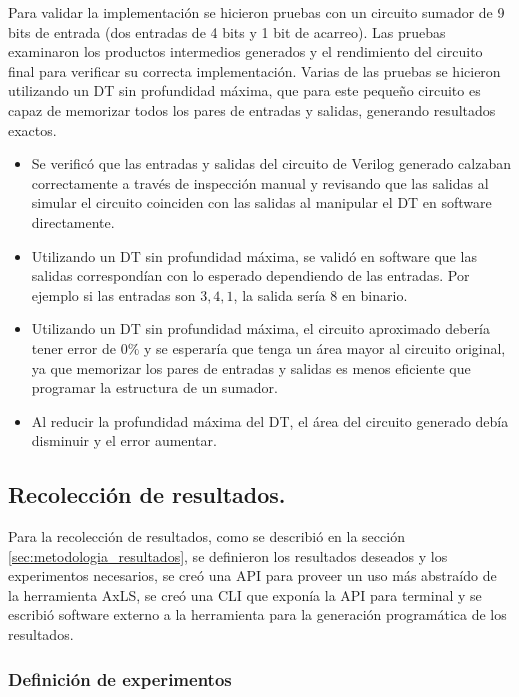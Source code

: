 Para validar la implementación se hicieron pruebas con un circuito sumador de 9
bits de entrada (dos entradas de 4 bits y 1 bit de acarreo). Las pruebas
examinaron los productos intermedios generados y el rendimiento del circuito
final para verificar su correcta implementación. Varias de las pruebas se
hicieron utilizando un DT sin profundidad máxima, que para este pequeño
circuito es capaz de memorizar todos los pares de entradas y salidas, generando
resultados exactos.

\begin{itemize}
  \item Se verificó que las entradas y salidas del circuito de Verilog generado
    calzaban correctamente a través de inspección manual y revisando que las
    salidas al simular el circuito coinciden con las salidas al manipular el DT
    en software directamente.
  \item Utilizando un DT sin profundidad máxima, se validó en software que
    las salidas correspondían con lo esperado dependiendo de las entradas. Por
    ejemplo si las entradas son ${3, 4, 1}$, la salida sería $8$ en binario.
  \item Utilizando un DT sin profundidad máxima, el circuito aproximado debería
    tener error de $0\%$ y se esperaría que tenga un área mayor al circuito
    original, ya que memorizar los pares de entradas y salidas es menos
    eficiente que programar la estructura de un sumador.
  \item Al reducir la profundidad máxima del DT, el área del circuito generado
    debía disminuir y el error aumentar.
\end{itemize}

\subsection{Recolección de resultados.}

Para la recolección de resultados, como se describió en la sección
\ref{sec:metodologia_resultados}, se definieron los resultados deseados y los
experimentos necesarios, se creó una API para proveer un uso más abstraído de
la herramienta AxLS, se creó una CLI que exponía la API para terminal y se
escribió software externo a la herramienta para la generación programática de
los resultados.

\subsubsection{Definición de experimentos}

